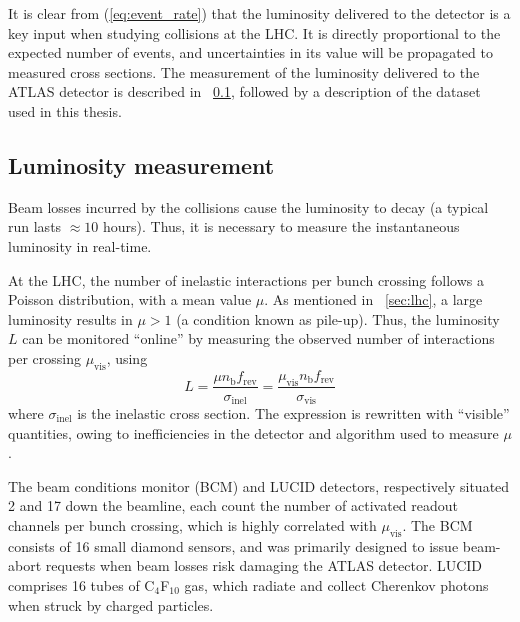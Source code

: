 
It is clear from (\ref{eq:event_rate}) that the luminosity delivered to the detector is a 
key input when studying \pp collisions at the LHC. It is directly proportional to the 
expected number of events, and uncertainties in its value will be propagated to measured 
cross sections. The measurement of the luminosity delivered to the ATLAS detector is 
described in \Section~\ref{sec:dataset:lumi}, followed by a description of the dataset 
used in this thesis.



\subsection{Luminosity measurement}
\label{sec:dataset:lumi}

Beam losses incurred by the collisions cause the luminosity to decay (a typical run lasts 
${\approx}10$ hours). Thus, it is necessary to measure the instantaneous luminosity in 
real-time.

At the LHC, the number of inelastic \pp interactions per bunch crossing follows a 
Poisson distribution, with a mean value $\mu$. As mentioned in \Section~\ref{sec:lhc}, 
a large luminosity results in $\mu > 1$ (a condition known as pile-up). Thus, the 
luminosity $L$ can be monitored ``online'' by measuring the observed number of interactions
per crossing $\mu_{\text{vis}}$, using \cite{Lumi2011}
\begin{equation}
	L = \frac{\mu n_{\text{b}} f_{\text{rev}}}{\sigma_{\text{inel}}}
	= \frac{\mu_{\text{vis}} n_{\text{b}} f_{\text{rev}}}{\sigma_{\text{vis}}}
	\label{eq:lumi_measure}
\end{equation}
where $\sigma_{\text{inel}}$ is the inelastic \pp cross section. The expression is 
rewritten with ``visible'' quantities, owing to inefficiencies in the detector and 
algorithm used to measure $\mu$.

The beam conditions monitor (BCM) and LUCID detectors, respectively situated 
\unit{2}{\metre} and \unit{17}{\metre} down the beamline, each count the number of 
activated readout channels per bunch crossing, which is highly correlated with 
$\mu_{\text{vis}}$. The BCM consists of 16 small diamond sensors, and was primarily 
designed to issue beam-abort requests when beam losses risk damaging the ATLAS detector. 
LUCID comprises 16 tubes of C$_4$F$_{10}$ gas, which radiate and collect Cherenkov 
photons when struck by charged particles.


